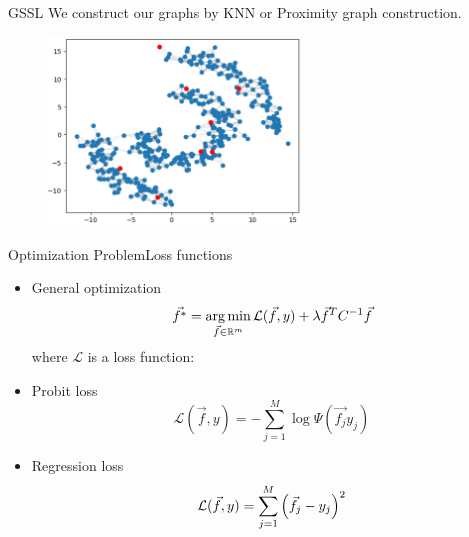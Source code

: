 	\begin{frame}{GSSL}
		We construct our graphs by KNN or Proximity graph construction.
		\begin{figure}[H]
			\centering
			\hspace*{0cm}\includegraphics[width=0.6\textwidth,height=\textwidth,keepaspectratio]{Figures/SpiKNNRBF.png}
		\end{figure}
	\end{frame}

	\begin{frame}{Optimization Problem}{Loss functions}
		\begin{itemize}
			\item General optimization
			\[\vec{f^*} = \operatorname*{arg\,min}_{\vec{f} \in \mathbb{R}^{m}} \mathcal{L}(\vec{f},y) + \lambda \vec{f}^{T}C^{-1}\vec{f}\]
			where $\mathcal{L}$ is a loss function:
			\item Probit loss
			\[
				\mathcal{L}(\vec{f},y) = - \sum_{j=1}^{M}\log \Psi (\vec{f_j}y_j)	
			\]
			\item Regression loss
			\[
				\mathcal{L}(\vec{f},y) = \sum_{j=1}^{M}{\left(\vec{f}_{j} - y_{j}\right)}^2
			\]
		\end{itemize}
	\end{frame}

